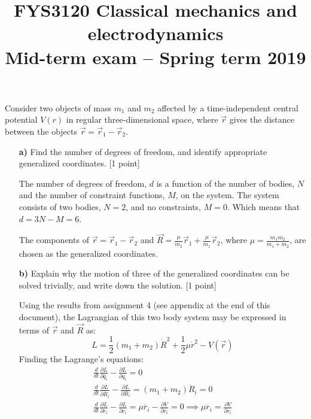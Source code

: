 \documentclass[11pt,a4paper]{report}
\title{FYS3120 Classical mechanics and electrodynamics\\
Mid-term exam -- Spring term 2019}
\author{}
\newcounter{excount}[chapter]
\newenvironment{exercise}[1][]{\addtocounter{excount}{1} \noindent {\bf Question
    \arabic{excount} \ \ #1}\hspace{2mm}}{\vspace{4mm}}
\begin{document}
\maketitle


\addtocounter{page}{1}


\begin{exercise}{\bf Central potentials\\}
Consider two objects of mass $m_1$ and $m_2$ affected by a time-independent central potential $V(r)$ in regular three-dimensional space, where $\vec r$ gives the distance between the objects $\vec r = \vec r_1- \vec r_2$.

\begin{itemize}
\item[{\bf a)}] Find the number of degrees of freedom, and identify appropriate generalized coordinates. [1 point] \par 
The number of degrees of freedom, $d$ is a function of the number of bodies, $N$ and the number of constraint functions, $M$, on the system.
The system consists of two bodies, $N=2$, and no constraints, $M=0$. Which means that $d=3N-M=6$. \par 
The components of $\vec{r}=\vec{r}_1-\vec{r}_2$ and $\vec{R}=\frac{\mu}{m_2}\vec{r}_1+\frac{\mu}{m_1}\vec{r}_2$, where $\mu=\frac{m_1m_2}{m_1+m_2}$, are chosen as the generalized coordinates.

\item[{\bf b)}] Explain why the motion of three of the generalized coordinates can be solved trivially, and write down the solution. [1 point] \par 


Using the results from assignment 4 (see appendix at the end of this document), the Lagrangian of this two body system may be expressed in terms of $\vec{r}$ and $\vec{R}$ as:
\begin{equation}
L=\frac{1}{2}(m_1+m_2)\dot{R}^2 +\frac{1}{2} \mu \dot{r}^2 -V(\vec{r})
\end{equation}
Finding the Lagrange's equations:
\begin{align}
\frac{d}{dt} \frac{\partial L}{\partial \dot{q_i}}-\frac{\partial L}{\partial q_i}=0 \\
\frac{d}{dt} \frac{\partial L}{\partial \dot{R_i}}-\frac{\partial L}{\partial R_i}=(m_1+m_2)\ddot{R}_i=0 \label{eq.1.b.ddotR}\\
\frac{d}{dt} \frac{\partial L}{\partial \dot{r_i}}-\frac{\partial L}{\partial r_i}=\mu \ddot{r_i}-\frac{\partial V}{\partial r_i}=0 \implies \mu\ddot{r}_i=\frac{\partial V}{\partial r_i}
\end{align}


\end{itemize}
\end{exercise}
\end{document}
